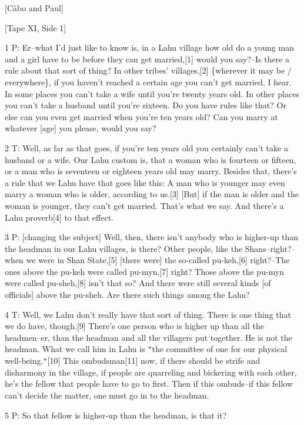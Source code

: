 
{[Càbo and Paul]}

{[Tape XI, Side 1]}

{1 P: Er--what I'd just like to know is, in a Lahu village how old do a
young man and a girl have to be before they can get married,[1] would you say?--Is
there a rule about that sort of thing? In other tribes' villages,[2] \{wherever
it may be / everywhere\}, if you haven't reached a certain age you can't get married,
I hear. In some places you can't take a wife until you're twenty years old. In
other places you can't take a husband until you're sixteen. Do you have rules like
that? Or else can you even get married when you're ten years old? Can you marry
at whatever [age] you please, would you say? }

{2 T: Well, as far as that goes, if you're ten years old you certainly can't
take a husband or a wife. Our Lahu custom is, that a woman who is fourteen or fifteen,
or a man who is seventeen or eighteen years old may marry. Besides that, there's
a rule that we Lahu have that goes like this: A man who is younger may even marry
a woman who is older, according to us.[3] [But] if the man is older and the woman
is younger, they can't get married. That's what we say. And there's a Lahu proverb[4]
to that effect. }

{3 P: [changing the subject] Well, then, there isn't anybody who is higher-up
than the headman in our Lahu villages, is there? Other people, like the Shans--right?--when
we were in Shan State,[5] [there were] the so-called pu-keh,[6] right?--The ones
above the pu-keh were called pu-myn,[7] right? Those above the pu-myn were called
pu-sheh,[8] isn't that so? And there were still several kinds [of officials] above
the pu-sheh. Are there such things among the Lahu? }

{4 T: Well, we Lahu don't really have that sort of thing. There is one thing
that we do have, though.[9] There's one person who is higher up than all the headmen--er,
than the headman and all the villagers put together. He is not the headman. What
we call him in Lahu is \texttt{"}the committee of one for our physical well-being.\texttt{"}[10]
This ombudsman[11] now, if there should be strife and disharmony in the village,
if people are quarreling and bickering with each other, he's the fellow that people
have to go to first. Then if this ombuds--if this fellow can't decide the matter,
one must go in to the headman.}

{5 P: So that fellow is higher-up than the headman, is that it?}

